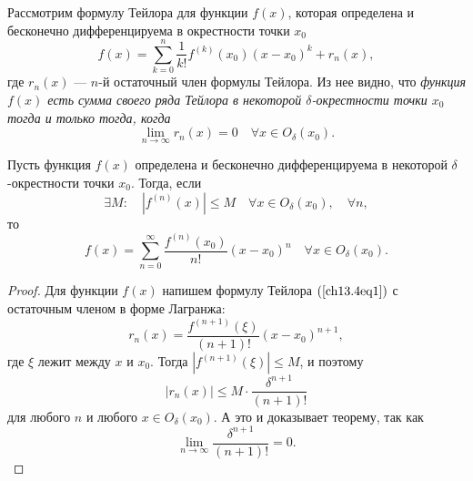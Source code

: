 Рассмотрим формулу Тейлора для функции $f(x)$, которая определена и бесконечно дифференцируема в окрестности точки $x_0$
\begin{equation} \label{ch13.4eq1}
f(x) = \sum\limits_{k = 0}^{n} \frac{1}{k!}f^{(k)}(x_0)(x - x_0)^k + r_n(x),
\end{equation}
где $r_n(x)$ --- $n$-й остаточный член формулы Тейлора. Из нее видно, что \textit{функция $f(x)$ есть сумма своего ряда Тейлора в некоторой $\delta$-окрестности точки $x_0$ тогда и только тогда, когда}
$$
\lim\limits_{n \to \infty} r_n(x) = 0 \quad \forall x \in O_\delta(x_0).
$$
\begin{thm}
Пусть функция $f(x)$ определена и бесконечно дифференцируема в некоторой $\delta$-окрестности точки $x_0$. Тогда, если
$$
\exists M: \quad |f^{(n)}(x)| \le M \quad \forall x \in O_\delta(x_0), \quad \forall n,
$$ 
то
$$
f(x) = \sum\limits_{n = 0}^{\infty} \frac{f^{(n)}(x_0)}{n!}(x - x_0)^n \quad \forall x \in O_\delta(x_0).
$$
\end{thm}
\begin{proof}
Для функции $f(x)$ напишем формулу Тейлора $(\ref{ch13.4eq1})$ с остаточным членом в форме Лагранжа:
$$
r_n(x) = \frac{f^{(n+1)}(\xi)}{(n + 1)!} (x - x_0)^{n + 1},
$$
где $\xi$ лежит между $x$ и $x_0$. Тогда $|f^{(n+1)}(\xi)| \le M$, и поэтому
$$
|r_n(x)| \le M \cdot \frac{\delta^{n + 1}}{(n + 1)!}
$$
для любого $n$ и любого $x \in O_\delta(x_0)$. А это и доказывает теорему, так как
$$
\lim\limits_{n \to \infty} \frac{\delta^{n + 1}}{(n + 1)!} = 0.
$$
\end{proof}